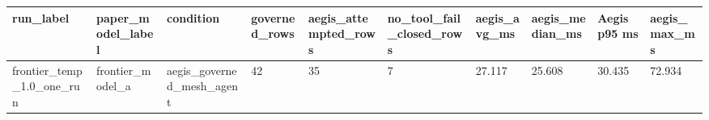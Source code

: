 \begin{tabular}{llllllllll}
 \hline
run\_label & paper\_model\_label & condition & governed\_rows & aegis\_attempted\_rows & no\_tool\_fail\_closed\_rows & aegis\_avg\_ms & aegis\_median\_ms & Aegis p95 ms & aegis\_max\_ms \\
 \hline
frontier\_temp\_1.0\_one\_run & frontier\_model\_a & aegis\_governed\_mesh\_agent & 42 & 35 & 7 & 27.117 & 25.608 & 30.435 & 72.934 \\
 \hline
\end{tabular}
